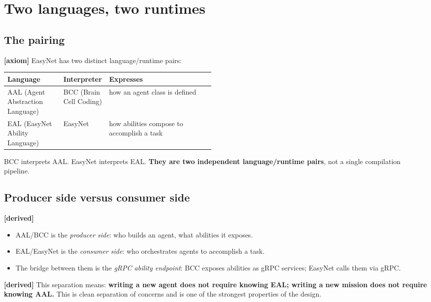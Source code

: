 \documentclass[11pt,a4paper]{article}
\newcommand{\axiom}{\textcolor{axiomcolor}{\textbf{[axiom]}}\xspace}
\newcommand{\derived}{\textcolor{derivedcolor}{\textbf{[derived]}}\xspace}
\begin{document}
\section{Two languages, two runtimes}
\label{sec:two-languages}

\subsection{The pairing}

\axiom{} EasyNet has two distinct language/runtime pairs:

\begin{center}
\renewcommand{\arraystretch}{1.3}
\begin{tabularx}{\linewidth}{L{0.27\linewidth} L{0.22\linewidth} X}
\toprule
\textbf{Language} & \textbf{Interpreter} & \textbf{Expresses} \\
\midrule
AAL (Agent Abstraction Language) & BCC (Brain Cell Coding) & how an agent
class is defined \\
EAL (EasyNet Ability Language) & EasyNet & how abilities compose to
accomplish a task \\
\bottomrule
\end{tabularx}
\end{center}

BCC interprets AAL. EasyNet interprets EAL. \textbf{They are two independent
language/runtime pairs}, not a single compilation pipeline.

\subsection{Producer side versus consumer side}

\derived{}
\begin{itemize}[leftmargin=2em,itemsep=0.3em]
    \item AAL/BCC is the \emph{producer side}: who builds an agent, what
    abilities it exposes.
    \item EAL/EasyNet is the \emph{consumer side}: who orchestrates agents to
    accomplish a task.
    \item The bridge between them is the \emph{gRPC ability endpoint}: BCC
    exposes abilities as gRPC services; EasyNet calls them via gRPC.
\end{itemize}

\derived{} This separation means: \textbf{writing a new agent does not
require knowing EAL; writing a new mission does not require knowing AAL.}
This is clean separation of concerns and is one of the strongest properties
of the design.
\end{document}
